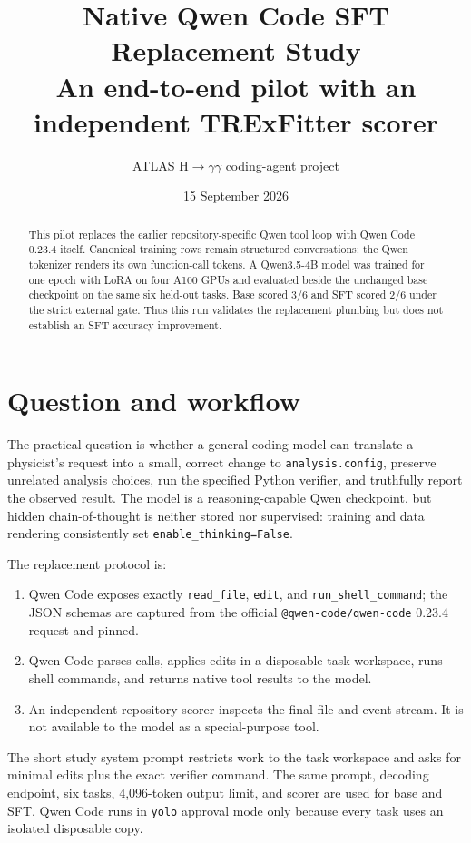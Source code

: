 \documentclass[10.5pt]{article}
\title{Native Qwen Code SFT Replacement Study\\\large An end-to-end pilot with an independent TRExFitter scorer}
\author{ATLAS H$\rightarrow\gamma\gamma$ coding-agent project}
\date{15 September 2026}
\newcommand{\code}[1]{\texttt{#1}}
\begin{document}
\maketitle

\begin{abstract}
This pilot replaces the earlier repository-specific Qwen tool loop with Qwen
Code 0.23.4 itself.  Canonical training rows remain structured conversations;
the Qwen tokenizer renders its own function-call tokens.  A Qwen3.5-4B model
was trained for one epoch with LoRA on four A100 GPUs and evaluated beside the
unchanged base checkpoint on the same six held-out tasks.  Base scored 3/6 and
SFT scored 2/6 under the strict external gate.  Thus this run validates the
replacement plumbing but does not establish an SFT accuracy improvement.
\end{abstract}

\section{Question and workflow}
The practical question is whether a general coding model can translate a
physicist's request into a small, correct change to \code{analysis.config},
preserve unrelated analysis choices, run the specified Python verifier, and
truthfully report the observed result.  The model is a reasoning-capable Qwen
checkpoint, but hidden chain-of-thought is neither stored nor supervised:
training and data rendering consistently set \code{enable\_thinking=False}.

The replacement protocol is:
\begin{enumerate}
  \item Qwen Code exposes exactly \code{read\_file}, \code{edit}, and
        \code{run\_shell\_command}; the JSON schemas are captured from the
        official \code{@qwen-code/qwen-code} 0.23.4 request and pinned.
  \item Qwen Code parses calls, applies edits in a disposable task workspace,
        runs shell commands, and returns native tool results to the model.
  \item An independent repository scorer inspects the final file and event
        stream.  It is not available to the model as a special-purpose tool.
\end{enumerate}
The short study system prompt restricts work to the task workspace and asks for
minimal edits plus the exact verifier command.  The same prompt, decoding
endpoint, six tasks, 4,096-token output limit, and scorer are used for base and
SFT.  Qwen Code runs in \code{yolo} approval mode only because every task uses
an isolated disposable copy.
\end{document}
